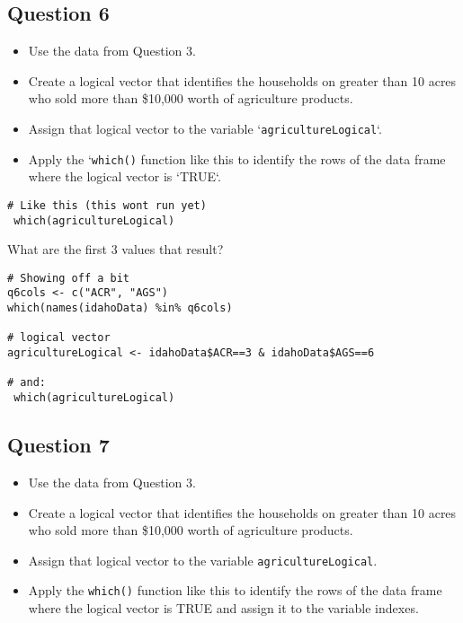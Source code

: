 \documentclass[]{article}
\begin{document}
\newpage
\subsection*{Question 6}
\begin{itemize}
\item Use the data from Question 3. 
\item Create a logical vector that identifies the households on greater than 10 acres who sold more than \$10,000 worth of agriculture products. 
\item Assign that logical vector to the variable `\texttt{agricultureLogical}`. 
\item Apply the `\texttt{which()} function like this to identify the rows of the data frame where the logical vector is `TRUE`.
\end{itemize}

\begin{framed} 
\begin{verbatim}
# Like this (this wont run yet)
 which(agricultureLogical) 
\end{verbatim}
\end{framed} 

What are the first 3 values that result?

\begin{framed} \begin{verbatim}
# Showing off a bit
q6cols <- c("ACR", "AGS")
which(names(idahoData) %in% q6cols)  

# logical vector
agricultureLogical <- idahoData$ACR==3 & idahoData$AGS==6

# and:
 which(agricultureLogical) 
\end{verbatim}\end{framed} 


\newpage
\subsection{Question 7}

\begin{itemize}
\item Use the data from Question 3. 
\item Create a logical vector that identifies the households on greater than 10 acres who
 sold more than \$10,000 worth of agriculture products. 
\item Assign that logical vector to the variable \texttt{agricultureLogical}. 
\item Apply the \texttt{which()} function like this to identify the rows of the 
data frame where the logical vector is TRUE and assign it to the variable indexes. 
\end{itemize}
\end{document}
